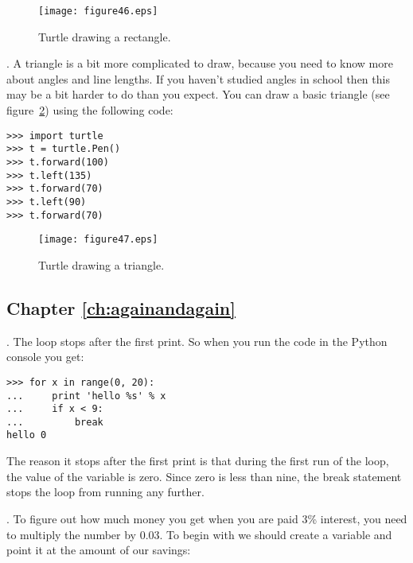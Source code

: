 \begin{figure}
\begin{center}
\texttt{[image: figure46.eps]}
\end{center}
\caption{Turtle drawing a rectangle.}\label{fig46}
\end{figure}

. A triangle is a bit more complicated to draw, because you need to know more about angles and line lengths.  If you haven't studied angles in school then this may be a bit harder to do than you expect.  You can draw a basic triangle (see figure~\ref{fig47}) using the following code:

\begin{listing}
\begin{verbatim}
>>> import turtle
>>> t = turtle.Pen()
>>> t.forward(100)
>>> t.left(135)
>>> t.forward(70)
>>> t.left(90)
>>> t.forward(70)
\end{verbatim}
\end{listing}

\begin{figure}
\begin{center}
\texttt{[image: figure47.eps]}
\end{center}
\caption{Turtle drawing a triangle.}\label{fig47}
\end{figure}


\subsection*{Chapter \ref{ch:againandagain}}

. The loop stops after the first print.  So when you run the code in the Python console you get:

\begin{listing}
\begin{verbatim}
>>> for x in range(0, 20):
...     print 'hello %s' % x
...     if x < 9:
...         break
hello 0
\end{verbatim}
\end{listing}

\noindent
The reason it stops after the first print is that during the first run of the loop, the value of the variable  is zero.  Since zero is less than nine, the break statement stops the loop from running any further.

. To figure out how much money you get when you are paid 3\% interest, you need to multiply the number by 0.03.  To begin with we should create a variable and point it at the amount of our savings:

